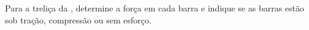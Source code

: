 Para a treliça da \figuraquestao, determine a força em cada barra e indique se as barras estão sob tração, compressão ou sem esforço. 
